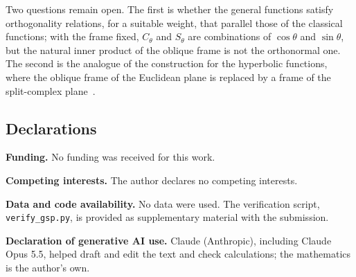 \documentclass[11pt]{amsart}
\theoremstyle{definition}
\theoremstyle{remark}
\numberwithin{equation}{section}
\begin{document}
Two questions remain open. The first is whether the general functions
satisfy orthogonality relations, for a suitable weight, that parallel
those of the classical functions; with the frame fixed, $C_\theta$ and
$S_\theta$ are combinations of $\cos\theta$ and $\sin\theta$, but the natural
inner product of the oblique frame is not the orthonormal one. The second
is the analogue of the construction for the hyperbolic functions, where
the oblique frame of the Euclidean plane is replaced by a frame of the
split-complex plane~\cite{Yaglom1968,HarkinHarkin2004}.

\subsection*{Declarations}

{\sloppy
\noindent\textbf{Funding.} No funding was received for this work.

\noindent\textbf{Competing interests.} The author declares no competing interests.

\noindent\textbf{Data and code availability.} No data were used. The
verification script, \texttt{verify\_gsp.py}, is provided as
supplementary material with the submission.

\noindent\textbf{Declaration of generative AI use.} Claude (Anthropic), including
Claude Opus 5.5, helped draft and edit the text and check calculations;
the mathematics is the author's own.\par}
\end{document}
